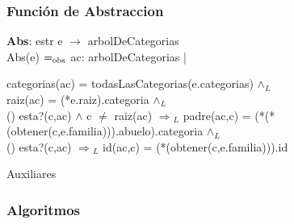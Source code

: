 \documentclass[10pt, a4paper]{article}
\begin{document}
\subsubsection{\Large Funci\'{o}n de Abstraccion}

	    \textbf{Abs}: estr e $\rightarrow$ arbolDeCategorias \\
   	    Abs(e) $=_{\mathrm{obs}}$ ac: arbolDeCategorias | \\
   	   \begin{flushright}
 categorias(ac) = todasLasCategorias(e.categorias) $\wedge{_L}$ \\
   	    raiz(ac) = (*e.raiz).categoria $\wedge{_L}$ \\
   	    () esta?(c,ac) $\wedge$ c $\neq$ raiz(ac) $\Rightarrow{_L}$
   	    padre(ac,c) = (*(*(obtener(c,e.familia))).abuelo).categoria $\wedge{_L}$ \\
   	    () esta?(c,ac) $\Rightarrow{_L}$ id(ac,c) = (*(obtener(c,e.familia))).id
\end{flushright}
		
Auxiliares\\



	\subsubsection{Algoritmos}
\end{document}
